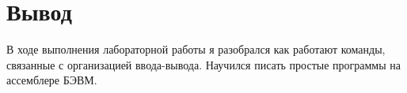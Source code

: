 \begin{center}
\begin{tabular}{|c|c|c|c|c|c|c|c|c|c|c|c|}
	\end{tabular}
\end{center}
\newpage

\section{Вывод}
В ходе выполнения лабораторной работы я разобрался как работают команды, связанные с организацией ввода-вывода. Научился писать простые программы на ассемблере БЭВМ.
